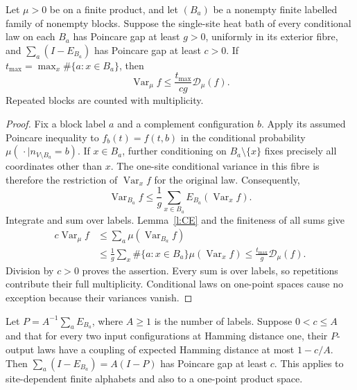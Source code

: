 \begin{lemma}\label{l:comparison}
Let \(\mu>0\) be on a finite product, and let \((B_a)\) be a
nonempty finite labelled family of nonempty blocks.
Suppose the single-site heat bath of every conditional law on each
\(B_a\) has Poincare gap at least \(g>0\), uniformly in its exterior fibre,
and \(\sum_a(I-E_{B_a})\) has Poincare gap at least \(c>0\).
If \(t_{\max}=\max_x\#\{a:x\in B_a\}\), then
\[
 \operatorname{Var}_\mu f\le
             \frac{t_{\max}}{cg}\mathcal D_\mu(f).
\]
Repeated blocks are counted with multiplicity.
\end{lemma}

\begin{proof}
Fix a block label \(a\) and a complement configuration \(b\).
Apply its assumed Poincare inequality to
\(f_b(t)=f(t,b)\) in the conditional probability
\(\mu(\,\cdot\mid n_{V\setminus B_a}=b)\).
If \(x\in B_a\), further conditioning on \(B_a\setminus\{x\}\)
fixes precisely all coordinates other than \(x\).  The one-site
conditional variance in this fibre is therefore the restriction of
\(\operatorname{Var}_x f\) for the original law.  Consequently,
\[
 \operatorname{Var}_{B_a}f
      \le\frac1g\sum_{x\in B_a}E_{B_a}
                                      (\operatorname{Var}_x f).
\]
Integrate and sum over labels.  Lemma~\ref{l:CE} and the finiteness
of all sums give
\[
 \begin{split}
 c\operatorname{Var}_\mu f
 &\le\sum_a\mu(\operatorname{Var}_{B_a}f)\\
 &\le\frac1g\sum_x\#\{a:x\in B_a\}
                         \mu(\operatorname{Var}_x f)
 \le\frac{t_{\max}}g\mathcal D_\mu(f).
 \end{split}
\]
Division by \(c>0\) proves the assertion.  Every sum is over labels,
so repetitions contribute their full multiplicity.  Conditional laws
on one-point spaces cause no exception because their variances vanish.
\end{proof}

\begin{lemma}\label{l:contraction}
Let \(P=A^{-1}\sum_aE_{B_a}\), where \(A\ge1\) is the number
of labels. Suppose \(0<c\le A\) and that for every two input
configurations at Hamming distance one, their \(P\)-output laws
have a coupling of expected Hamming distance at most \(1-c/A\).
Then \(\sum_a(I-E_{B_a})=A(I-P)\) has Poincare gap at least \(c\).
This applies to site-dependent finite alphabets and also to a
one-point product space.
\end{lemma}

